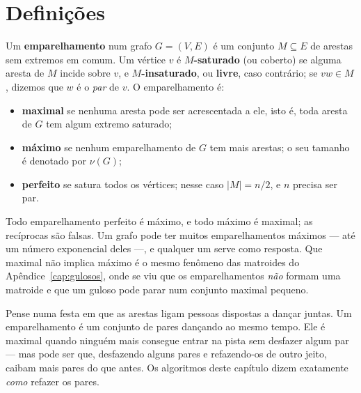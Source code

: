 \section{Definições}\label{sec:emp}
Um \textbf{emparelhamento} num grafo $G=(V,E)$ é um conjunto $M\subseteq E$ de arestas sem extremos em comum. Um vértice $v$ é \textbf{$M$-saturado} (ou coberto) se alguma aresta de $M$ incide sobre $v$, e \textbf{$M$-insaturado}, ou \textbf{livre}, caso contrário; se $vw\in M$, dizemos que $w$ é o \emph{par} de $v$. O emparelhamento é:
\begin{itemize}
  \item \textbf{maximal} se nenhuma aresta pode ser acrescentada a ele, isto é, toda aresta de $G$ tem algum extremo saturado;
  \item \textbf{máximo} se nenhum emparelhamento de $G$ tem mais arestas; o seu tamanho é denotado por $\nu(G)$;
  \item \textbf{perfeito} se satura todos os vértices; nesse caso $|M|=n/2$, e $n$ precisa ser par.
\end{itemize}
Todo emparelhamento perfeito é máximo, e todo máximo é maximal; as recíprocas são falsas. Um grafo pode ter muitos emparelhamentos máximos --- até um número exponencial deles ---, e qualquer um serve como resposta. Que maximal não implica máximo é o mesmo fenômeno das matroides do Apêndice~\ref{cap:gulosos}, onde se viu que os emparelhamentos \emph{não} formam uma matroide e que um guloso pode parar num conjunto maximal pequeno.

\begin{intuicao}
Pense numa festa em que as arestas ligam pessoas dispostas a dançar juntas. Um emparelhamento é um conjunto de pares dançando ao mesmo tempo. Ele é maximal quando ninguém mais consegue entrar na pista sem desfazer algum par --- mas pode ser que, desfazendo alguns pares e refazendo-os de outro jeito, caibam mais pares do que antes. Os algoritmos deste capítulo dizem exatamente \emph{como} refazer os pares.
\end{intuicao}


